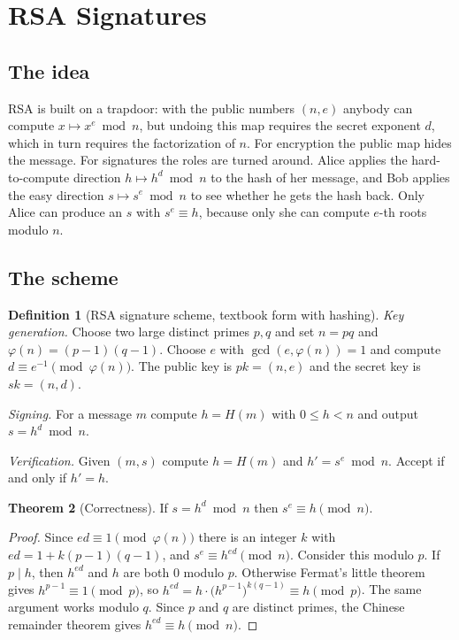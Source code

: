 \documentclass[11pt,a4paper]{article}
\theoremstyle{definition}
\newtheorem{definition}{Definition}[section]
\newtheorem{theorem}[definition]{Theorem}
\newcommand{\sk}{\mathit{sk}}
\newcommand{\pk}{\mathit{pk}}
\newcommand{\Hash}{H}
\newcommand{\inv}[1]{#1^{-1}}
\begin{document}
\section{RSA Signatures}

\subsection{The idea}

RSA is built on a trapdoor: with the public numbers $(n,e)$ anybody can compute $x \mapsto x^e \bmod n$, but undoing this map requires the secret exponent $d$, which in turn requires the factorization of $n$. For encryption the public map hides the message. For signatures the roles are turned around. Alice applies the hard-to-compute direction $h \mapsto h^d \bmod n$ to the hash of her message, and Bob applies the easy direction $s \mapsto s^e \bmod n$ to see whether he gets the hash back. Only Alice can produce an $s$ with $s^e \equiv h$, because only she can compute $e$-th roots modulo $n$.

\subsection{The scheme}

\begin{definition}[RSA signature scheme, textbook form with hashing]
\emph{Key generation.} Choose two large distinct primes $p,q$ and set $n=pq$ and $\varphi(n)=(p-1)(q-1)$. Choose $e$ with $\gcd(e,\varphi(n))=1$ and compute $d \equiv \inv{e} \pmod{\varphi(n)}$. The public key is $\pk=(n,e)$ and the secret key is $\sk=(n,d)$.

\emph{Signing.} For a message $m$ compute $h=\Hash(m)$ with $0\le h<n$ and output $s = h^{d} \bmod n$.

\emph{Verification.} Given $(m,s)$ compute $h=\Hash(m)$ and $h' = s^{e} \bmod n$. Accept if and only if $h'=h$.
\end{definition}

\begin{theorem}[Correctness]
If $s = h^d \bmod n$ then $s^e \equiv h \pmod n$.
\end{theorem}
\begin{proof}
Since $ed\equiv 1 \pmod{\varphi(n)}$ there is an integer $k$ with $ed=1+k(p-1)(q-1)$, and $s^e\equiv h^{ed} \pmod n$. Consider this modulo $p$. If $p\mid h$, then $h^{ed}$ and $h$ are both $0$ modulo $p$. Otherwise Fermat's little theorem gives $h^{p-1}\equiv 1 \pmod p$, so $h^{ed}=h\cdot\big(h^{p-1}\big)^{k(q-1)}\equiv h \pmod p$. The same argument works modulo $q$. Since $p$ and $q$ are distinct primes, the Chinese remainder theorem gives $h^{ed}\equiv h \pmod n$.
\end{proof}
\end{document}
